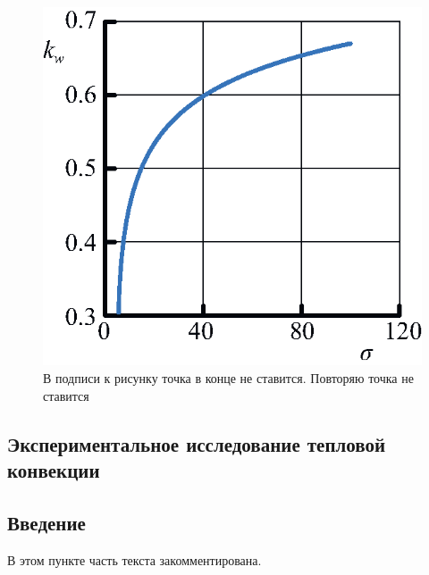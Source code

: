 \documentclass[14pt,a4paper,oneside]{extarticle}	%
\begin{document}
	\begin{figure}[h!] 	%
		\centering 		%
		\includegraphics{101} %
		\caption{В подписи к рисунку точка в конце не ставится. Повторяю точка не ставится}
	\end{figure}
	
\newpage

	\begin{center}
		\section{Экспериментальное исследование тепловой конвекции} 			%
	\end{center}

	\subsection{Введение} 	%

В этом пункте часть текста закомментирована.
	

\end{document}

